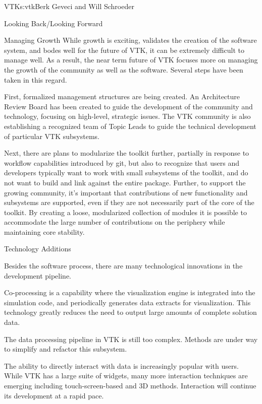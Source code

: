 \begin{aosachapter}{VTK}{s:vtk}{Berk Geveci and Will Schroeder}
\begin{aosasect1}{Looking Back/Looking Forward}
\begin{aosasect2}{Managing Growth}
While growth is exciting, validates the creation of the software
system, and bodes well for the future of VTK, it can be extremely
difficult to manage well. As a result, the near term future of VTK
focuses more on managing the growth of the community as well as the
software. Several steps have been taken in this regard.

First, formalized management structures are being created. An
Architecture Review Board has been created to guide the development of
the community and technology, focusing on high-level, strategic
issues. The VTK community is also establishing a recognized team of
Topic Leads to guide the technical development of particular VTK
subsystems.

Next, there are plans to modularize the toolkit further, partially in
response to workflow capabilities introduced by git, but also to
recognize that users and developers typically want to work with small
subsystems of the toolkit, and do not want to build and link against
the entire package. Further, to support the growing community, it's
important that contributions of new functionality and subsystems are
supported, even if they are not necessarily part of the core of the
toolkit. By creating a loose, modularized collection of modules it is
possible to accommodate the large number of contributions on the
periphery while maintaining core stability.

\end{aosasect2}

\begin{aosasect2}{Technology Additions}

Besides the software process, there are many technological innovations
in the development pipeline.

\begin{aosaitemize}

  \item Co-processing is a capability where the visualization engine is
  integrated into the simulation code, and periodically generates data
  extracts for visualization. This technology greatly reduces the need
  to output large amounts of complete solution data.

  \item The data processing pipeline in VTK is still too
  complex. Methods are under way to simplify and refactor this
  subsystem.

  \item The ability to directly interact with data is increasingly
  popular with users. While VTK has a large suite of widgets, many
  more interaction techniques are emerging including
  touch-screen-based and 3D methods. Interaction will continue its
  development at a rapid pace.


\end{aosaitemize}
\end{aosasect2}
\end{aosasect1}
\end{aosachapter}
